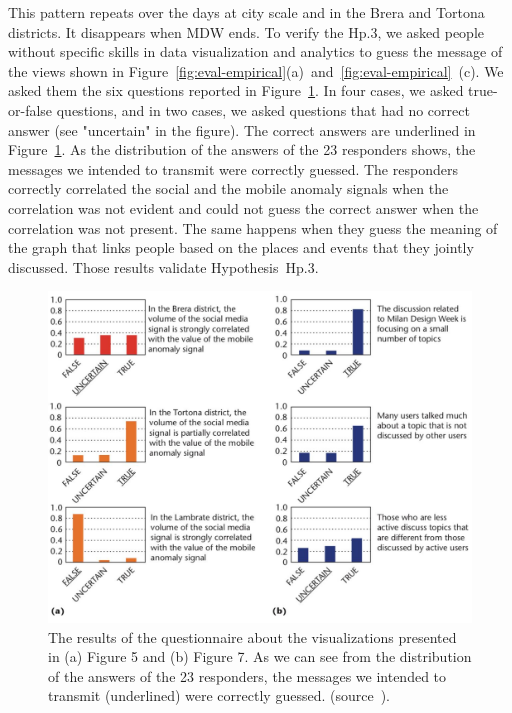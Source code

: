 This pattern repeats over the days at city scale and in the Brera and Tortona districts. It disappears when MDW ends.
To verify the \textsf{Hp.3}, we asked people without specific skills in data visualization and analytics to guess the message of the views shown in Figure~\ref{fig:eval-empirical}(a)~and~\ref{fig:eval-empirical}~(c). We asked them the six questions reported in Figure~\ref{fig:eval-empirical-quest}. In four cases, we asked true-or-false questions, and in two cases, we asked questions that had no correct answer (see "uncertain" in the figure). The correct answers are underlined in Figure~\ref{fig:eval-empirical-quest}. As the distribution of the answers of the 23 responders shows, the messages we intended to transmit were correctly guessed. The responders correctly correlated the social and the mobile anomaly signals when the correlation was not evident and could not guess the correct answer when the correlation was not present. The same happens when they guess the meaning of the graph that links people based on the places and events that they jointly discussed.
Those results validate Hypothesis~\textsf{Hp.3}.

\begin{figure}[t]
\centering
\includegraphics[width=.9\linewidth]{img/mdw-vis-7}
\caption{The results of the questionnaire about the visualizations presented in (a) Figure 5 and (b) Figure 7. As we can see from the distribution of the answers of the 23 responders, the messages we intended to transmit (underlined) were correctly guessed. (source~\cite{DBLP:journals/ieeemm/BalduiniVALAC15}).}
\label{fig:eval-empirical-quest}
\end{figure}

